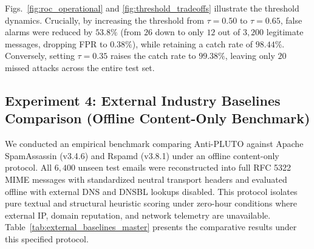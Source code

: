 \documentclass[journal]{IEEEtran}
\begin{document}
Figs.~\ref{fig:roc_operational} and \ref{fig:threshold_tradeoffs} illustrate the threshold dynamics. Crucially, by increasing the threshold from $\tau = 0.50$ to $\tau = 0.65$, false alarms were reduced by $\mathbf{53.8\%}$ (from $26$ down to only $12$ out of $3,200$ legitimate messages, dropping FPR to $\mathbf{0.38\%}$), while retaining a catch rate of $\mathbf{98.44\%}$. Conversely, setting $\tau = 0.35$ raises the catch rate to $\mathbf{99.38\%}$, leaving only $20$ missed attacks across the entire test set.

\subsection{Experiment 4: External Industry Baselines Comparison (Offline Content-Only Benchmark)}
We conducted an empirical benchmark comparing Anti-PLUTO against Apache SpamAssassin (v3.4.6) and Rspamd (v3.8.1) under an offline content-only protocol. All $6,400$ unseen test emails were reconstructed into full RFC 5322 MIME messages with standardized neutral transport headers and evaluated offline with external DNS and DNSBL lookups disabled. This protocol isolates pure textual and structural heuristic scoring under zero-hour conditions where external IP, domain reputation, and network telemetry are unavailable. Table~\ref{tab:external_baselines_master} presents the comparative results under this specified protocol.
\end{document}
